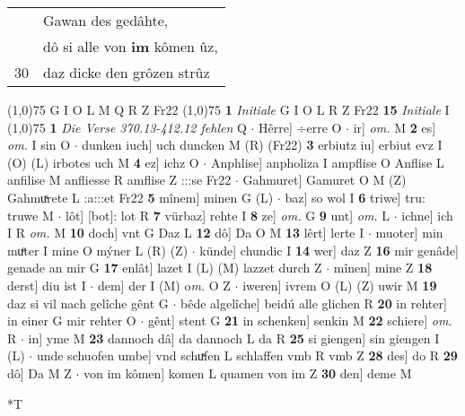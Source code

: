 \documentclass[8pt,a4paper,notitlepage]{article}
\begin{document}
\begin{table}[ht]
\begin{minipage}[t]{0.5\linewidth}
\begin{tabular}{rl}
 & Gawan des gedâhte,\\ 
 & dô si alle von \textbf{im} kômen ûz,\\ 
30 & daz dicke den grôzen strûz\\ 
\end{tabular}
\scriptsize
\line(1,0){75} \newline
G I O L M Q R Z Fr22 \newline
\line(1,0){75} \newline
\textbf{1} \textit{Initiale} G I O L R Z Fr22  \textbf{15} \textit{Initiale} I  \newline
\line(1,0){75} \newline
\textbf{1} \textit{Die Verse 370.13-412.12 fehlen} Q   $\cdot$ Hêrre] ÷erre O  $\cdot$ ir] \textit{om.} M \textbf{2} es] \textit{om.} I sin O  $\cdot$ dunken iuch] uch duncken M (R) (Fr22) \textbf{3} erbiutz iu] erbiut evz I (O) (L) irbotes uch M \textbf{4} ez] ichz O  $\cdot$ Anphlise] anpholiza I ampflise O Anflise L anfilise M anfliesse R amflise Z :::se Fr22  $\cdot$ Gahmuret] Gamuret O M (Z) Gahmuͯrete L :a:::et Fr22 \textbf{5} mînem] minen G (L)  $\cdot$ baz] so wol I \textbf{6} triwe] tru: truwe M  $\cdot$ lôt] [bot]: lot R \textbf{7} vürbaz] rehte I \textbf{8} ze] \textit{om.} G \textbf{9} unt] \textit{om.} L  $\cdot$ ichne] ich I R \textit{om.} M \textbf{10} doch] vnt G Daz L \textbf{12} dô] Da O M \textbf{13} lêrt] lerte I  $\cdot$ muoter] min muͤter I mine O mýner L (R) (Z)  $\cdot$ künde] chundic I \textbf{14} wer] daz Z \textbf{16} mir genâde] genade an mir G \textbf{17} enlât] lazet I (L) (M) lazzet durch Z  $\cdot$ mînen] mine Z \textbf{18} derst] diu ist I  $\cdot$ dem] der I (M) o\textit{m. } O Z  $\cdot$ iweren] ivrem O (L) (Z) uwir M \textbf{19} daz si vil nach gelîche gênt G  $\cdot$ bêde algelîche] beidú alle glichen R \textbf{20} in rehter] in einer G mir rehter O  $\cdot$ gênt] stent G \textbf{21} in schenken] senkin M \textbf{22} schiere] \textit{om.} R  $\cdot$ in] yme M \textbf{23} dannoch dâ] da dannoch L da R \textbf{25} si giengen] sin giengen I (L)  $\cdot$ unde schuofen umbe] vnd schuͯfen L schlaffen vmb R vmb Z \textbf{28} des] do R \textbf{29} dô] Da M Z  $\cdot$ von im kômen] komen L quamen von im Z \textbf{30} den] deme M \newline
\end{minipage}
\hspace{0.5cm}
\begin{minipage}[t]{0.5\linewidth}
\small
\begin{center}*T
\end{center}

\end{minipage}
\end{table}
\end{document}
